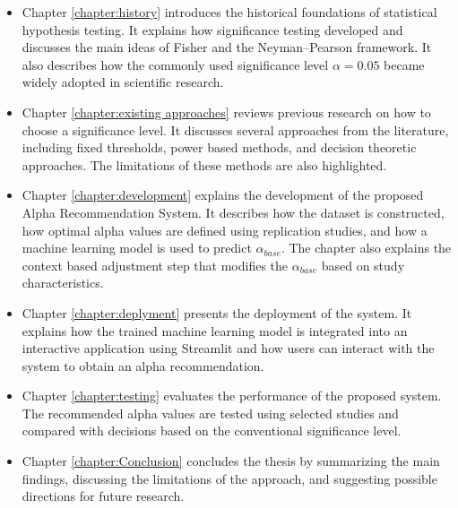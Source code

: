 \begin{itemize}
	
	\item Chapter \ref{chapter:history} introduces the historical foundations of statistical hypothesis testing. It explains how significance testing developed and discusses the main ideas of Fisher and the Neyman–Pearson framework. It also describes how the commonly used significance level $\alpha = 0.05$ became widely adopted in scientific research.
	
	\item Chapter \ref{chapter:existing approaches} reviews previous research on how to choose a significance level. It discusses several approaches from the literature, including fixed thresholds, power based methods, and decision theoretic approaches. The limitations of these methods are also highlighted.
	
	\item Chapter \ref{chapter:development} explains the development of the proposed Alpha Recommendation System. It describes how the dataset is constructed, how optimal alpha values are defined using replication studies, and how a machine learning model is used to predict $\alpha_{base}$. The chapter also explains the context based adjustment step that modifies the $\alpha_{base}$ based on study characteristics.
	
	\item Chapter \ref{chapter:deplyment} presents the deployment of the system. It explains how the trained machine learning model is integrated into an interactive application using Streamlit and how users can interact with the system to obtain an alpha recommendation.
	
	\item Chapter \ref{chapter:testing} evaluates the performance of the proposed system. The recommended alpha values are tested using selected studies and compared with decisions based on the conventional significance level.
	
	\item Chapter \ref{chapter:Conclusion} concludes the thesis by summarizing the main findings, discussing the limitations of the approach, and suggesting possible directions for future research.
	
\end{itemize}


